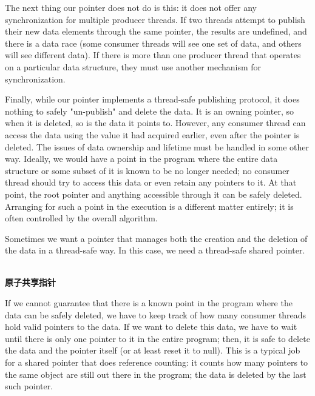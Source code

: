 The next thing our pointer does not do is this: it does not offer any synchronization for multiple producer threads. If two threads attempt to publish their new data elements through the same pointer, the results are undefined, and there is a data race (some consumer threads will see one set of data, and others will see different data). If there is more than one producer thread that operates on a particular data structure, they must use another mechanism for synchronization.

Finally, while our pointer implements a thread-safe publishing protocol, it does nothing to safely "un-publish" and delete the data. It is an owning pointer, so when it is deleted, so is the data it points to. However, any consumer thread can access the data using the value it had acquired earlier, even after the pointer is deleted. The issues of data ownership and lifetime must be handled in some other way. Ideally, we would have a point in the program where the entire data structure or some subset of it is known to be no longer needed; no consumer thread should try to access this data or even retain any pointers to it. At that point, the root pointer and anything accessible through it can be safely deleted. Arranging for such a point in the execution is a different matter entirely; it is often controlled by the overall algorithm.

Sometimes we want a pointer that manages both the creation and the deletion of the data in a thread-safe way. In this case, we need a thread-safe shared pointer.

\hspace*{\fill} \\ %
\noindent
\textbf{原子共享指针}

If we cannot guarantee that there is a known point in the program where the data can be safely deleted, we have to keep track of how many consumer threads hold valid pointers to the data. If we want to delete this data, we have to wait until there is only one pointer to it in the entire program; then, it is safe to delete the data and the pointer itself (or at least reset it to null). This is a typical job for a shared pointer that does reference counting: it counts how many pointers to the same object are still out there in the program; the data is deleted by the last such pointer.

